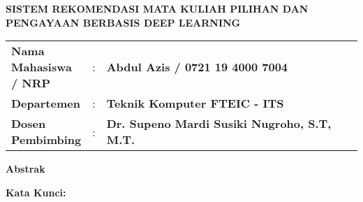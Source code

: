 {
\begin{center}
    \uppercase{\textbf{\large Sistem rekomendasi Mata Kuliah Pilihan dan Pengayaan berbasis Deep Learning}}
\end{center}

\vspace*{6 mm}
\begin{adjustwidth}{}{}
    \begin{tabular}{lcp{1\linewidth}}
        \noindent\textbf{Nama Mahasiswa / NRP} & : & \textbf{Abdul Azis / 0721 19 4000 7004}             \\
        \noindent\textbf{Departemen}           & : & \textbf{Teknik Komputer FTEIC - ITS}                \\
        \noindent\textbf{Dosen Pembimbing}     & : & \textbf{Dr. Supeno Mardi Susiki Nugroho, S.T, M.T.} \\
    \end{tabular}
\end{adjustwidth}

\vspace{6 mm}
\noindent
\textbf{Abstrak}
\vspace{3 mm}


\vspace{6 mm}
\noindent
\textbf{Kata Kunci: }
}